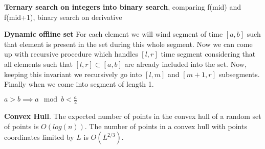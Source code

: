 \documentclass[a4paper,10pt,oneside]{article}
\begin{document}
\begin{multicols}{2}
\textbf{Ternary search on integers into binary search}, comparing f(mid) and f(mid+1), binary search on derivative

\textbf{Dynamic offline set} For each element we will wind segment of time $[a, b]$ such that element is present in the set during this whole segment. Now we can come up with recursive procedure which handles $[l, r]$ time segment considering that all elements such that $[l, r] \subset [a, b]$ are already included into the set. Now, keeping this invariant we recursively go into $[l, m]$ and $[m+1, r]$ subsegments. Finally when we come into segment of length 1.

$a > b \implies a \mod b < \frac{a}{2}$

\textbf{Convex Hull}. The expected number of points in the convex hull of a random set of points is $O(log(n))$. The number of points in a convex hull with points coordinates limited by $L$ is $O(L^{2/3})$.

\end{multicols}
\end{document}
